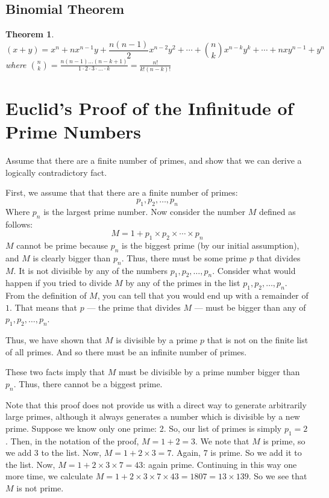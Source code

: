 \documentclass[10pt]{report}
\newtheorem{thm2}{Theorem}[section]
\begin{document}
\subsection{Binomial Theorem}
\begin{thm2}
$$(x+y)=x^n+nx^{n-1}y+\frac{n(n-1)}{2}x^{n-2}y^2+\cdots+{n\choose k}x^{n-k}y^k+\cdots+nxy^{n-1}+y^n$$
where ${n\choose k}=\frac{n(n-1)...(n-k+1)}{1\cdot 2\cdot 3\cdot ... \cdot k}=\frac{n!}{k!(n-k)!}$
\end{thm2}

\section{Euclid's Proof of the Infinitude of Prime Numbers}

Assume that there are a finite number of primes, and show that we can derive a logically contradictory fact.

First, we assume that that there are a finite number of primes:
$$p_1,p_2, \dots , p_n$$
Where $p_n$ is the largest prime number. Now consider the number $M$ defined as follows:
    $$M = 1 + p_1 \times p_2 \times \cdots \times p_n$$
    $M$ cannot be prime because $p_n$ is the biggest prime (by our initial assumption), and $M$ is clearly bigger than $p_n$. Thus, there must be some prime $p$ that divides $M$.
    It is not divisible by any of the numbers $p_1, p_2,\dots , p_n$. Consider what would happen if you tried to divide $M$ by any of the primes in the list $p_1, p_2,\dots , p_n$. From the definition of $M$, you can tell that you would end up with a remainder of $1$. That means that $p$ --- the prime that divides $M$ --- must be bigger than any of $p_1, p_2,\dots , p_n$.

Thus, we have shown that $M$ is divisible by a prime $p$ that is not on the finite list of all primes. And so there must be an infinite number of primes.

These two facts imply that $M$ must be divisible by a prime number bigger than $p_n$. Thus, there cannot be a biggest prime.

Note that this proof does not provide us with a direct way to generate arbitrarily large primes, although it always generates a number which is divisible by a new prime. Suppose we know only one prime: 2. So, our list of primes is simply $p_1=2$. Then, in the notation of the proof, $M=1+2=3$. We note that $M$ is prime, so we add $3$ to the list. Now, $M = 1 +2 \times 3 = 7$. Again, $7$ is prime. So we add it to the list. Now, $M = 1+2\times 3\times 7 = 43$: again prime. Continuing in this way one more time, we calculate $M = 1+2\times 3\times 7\times 43 = 1807 =13\times 139$. So we see that $M$ is not prime.
\end{document}

